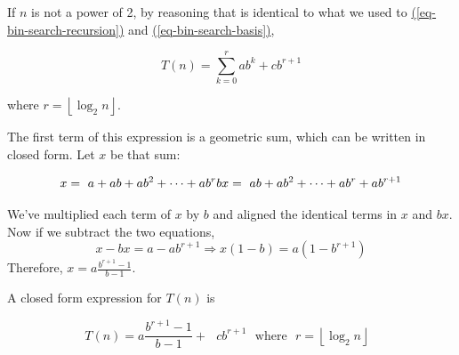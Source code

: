 \documentclass[10pt,]{book}
\theoremstyle{plain}
\theoremstyle{definition}
\theoremstyle{definition}
\theoremstyle{definition}
\theoremstyle{definition}
\numberwithin{equation}{section}
\begin{document}
If \(n\) is not a power of 2, by reasoning that is identical to what we used to \hyperref[eq-bin-search-recursion]{(\ref{eq-bin-search-recursion})}  and \hyperref[eq-bin-search-basis]{(\ref{eq-bin-search-basis})},



 \[T(n) =\sum_{k=0}^r a b^k+ c b^{r+1}\]



where \(r = \left\lfloor \log_2n\right\rfloor\).%
\par
 The first term of this expression is a geometric sum, which can be written in closed form. Let \(x\) be that sum:

 \[x =\textrm{  }a + a b + a b^2+\cdots  + a b^r \\
   b x=\textrm{            }a b + a b^2+\cdots  + a b^r + a b^{r+1}\]

We've multiplied each term of \(x\) by \(b\) and aligned the identical terms in \(x\) and \( bx\). Now if we subtract the two equations,
\begin{equation*}x - b x = a - a b ^{r+1} \Rightarrow x(1-b) = a\left(1-b^{r+1}\right)\end{equation*} 
Therefore, \(x = a\frac{b^{r+1}-1}{b-1}\).%
\par
A closed form expression for \(T(n)\) is



\begin{equation*}T(n) = a\frac{b^{r+1}-1}{b-1} +\text{  }c b^{r+1}\text{  }\text{where}\text{  }r = \left\lfloor \log_2n\right\rfloor \text{  }\end{equation*}
%
\typeout{************************************************}
\typeout{************************************************}
\end{document}
